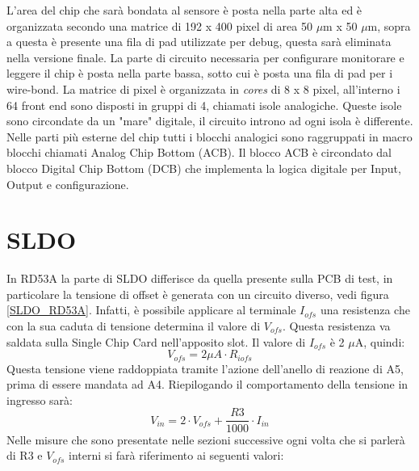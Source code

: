 L'area del chip che sarà bondata al sensore è posta nella parte alta ed è organizzata secondo una matrice di 192 x 400 pixel di area 50 $\mu$m x 50 $\mu$m, sopra a questa è presente una fila di pad utilizzate per debug, questa sarà eliminata nella versione finale. La parte di circuito necessaria per configurare monitorare e leggere il chip è posta nella parte bassa, sotto cui è posta una fila di pad per i wire-bond. 
La matrice di pixel è organizzata in \textit{cores} di 8 x 8 pixel, all'interno i 64 front end sono disposti in gruppi di 4, chiamati isole analogiche. 
Queste isole sono circondate da un "mare" digitale, il circuito introno ad ogni isola è differente. 
Nelle parti più esterne del chip tutti i blocchi analogici sono raggruppati in macro blocchi chiamati Analog Chip Bottom (ACB). Il blocco ACB è circondato dal blocco Digital Chip Bottom (DCB) che implementa la logica digitale per Input, Output e configurazione.

\section{SLDO}
In RD53A la parte di SLDO differisce da quella presente sulla PCB di test, in particolare la tensione di offset è generata con un circuito diverso, vedi figura \ref{SLDO_RD53A}. Infatti, è possibile applicare al terminale $I_{ofs}$ una resistenza che con la sua caduta di tensione determina il valore di $V_{ofs}$. 
Questa resistenza va saldata sulla Single Chip Card nell'apposito slot. Il valore di $I_{ofs}$ è 2 $\mu$A, quindi:
\begin{equation}
\label{eq:Vofs}
V_{ofs} = 2 \mu A \cdot R_{iofs}
\end{equation}
Questa tensione viene raddoppiata tramite l'azione dell'anello di reazione di A5, prima di essere mandata ad A4.
Riepilogando il comportamento della tensione in ingresso sarà:
\begin{equation}
V_{in}= 2 \cdot V_{ofs} + \dfrac{R3}{1000} \cdot I_{in}
\end{equation}
Nelle misure che sono presentate nelle sezioni successive ogni volta che si parlerà di R3 e $V_{ofs}$ interni si farà riferimento ai seguenti valori:

